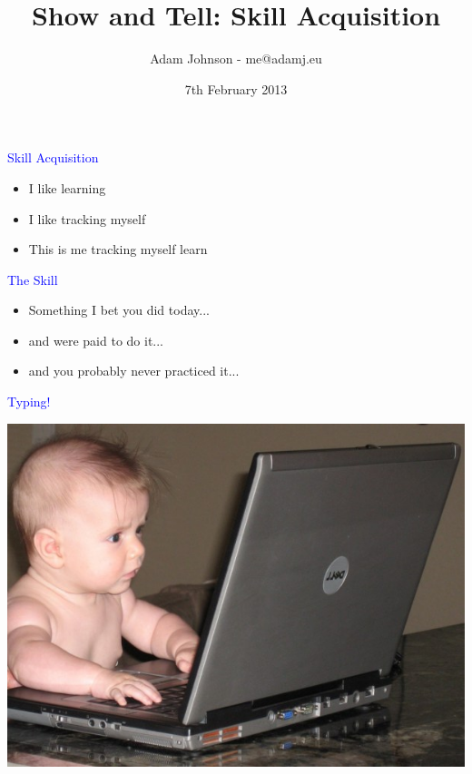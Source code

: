 \documentclass[landscape]{slides}
\title{Show and Tell: Skill Acquisition}
\author{Adam Johnson - me@adamj.eu}
\date{7th February 2013}
\begin{document}
\maketitle

\begin{slide}

    \textcolor{blue}{\Large{Skill Acquisition}}

    \begin{itemize}
        \item I like learning
        \item I like tracking myself
        \item This is me tracking myself learn
    \end{itemize}

\end{slide}

\begin{slide}

    \textcolor{blue}{\Large{The Skill}}

    \begin{itemize}
        \item Something I bet you did today...
        \item and were paid to do it...
        \item and you probably never practiced it...
    \end{itemize}

\end{slide}

\begin{slide}

    \textcolor{blue}{\Large{Typing!}}

    \includegraphics[height=10cm]{baby-nerd}

\end{slide}
\end{document}
